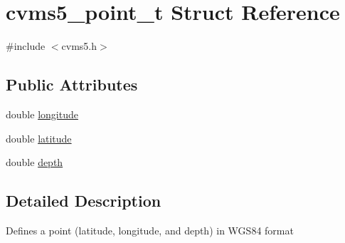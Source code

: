 \hypertarget{structcvms5__point__t}{\section{cvms5\+\_\+point\+\_\+t Struct Reference}
\label{structcvms5__point__t}
}


{\ttfamily \#include $<$cvms5.\+h$>$}

\subsection*{Public Attributes}
\begin{DoxyCompactItemize}
\item 
double \hyperlink{structcvms5__point__t_af9876379c7c09e9037e15ea0db3af896}{longitude}
\item 
double \hyperlink{structcvms5__point__t_a0d0ac87897769f0246fbe820e8e642e0}{latitude}
\item 
double \hyperlink{structcvms5__point__t_ad1f5b60d171202bf9c0a7b84b84eff2a}{depth}
\end{DoxyCompactItemize}


\subsection{Detailed Description}
Defines a point (latitude, longitude, and depth) in W\+G\+S84 format 

